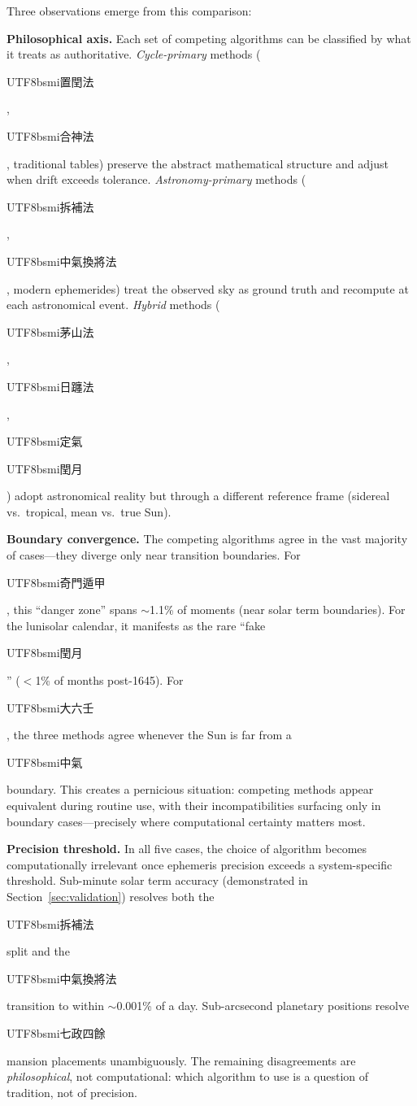 \documentclass[10pt,a4paper]{article}
\newcommand{\zh}[1]{\begin{CJK}{UTF8}{bsmi}#1\end{CJK}}
\begin{document}
Three observations emerge from this comparison:

\textbf{Philosophical axis.} Each set of competing algorithms can be
classified by what it treats as authoritative. \emph{Cycle-primary}
methods (\zh{置閏法}, \zh{合神法}, traditional tables) preserve the
abstract mathematical structure and adjust when drift exceeds tolerance.
\emph{Astronomy-primary} methods (\zh{拆補法}, \zh{中氣換將法}, modern
ephemerides) treat the observed sky as ground truth and recompute at each
astronomical event. \emph{Hybrid} methods (\zh{茅山法}, \zh{日躔法},
\zh{定氣} \zh{閏月}) adopt astronomical reality but through a different
reference frame (sidereal vs.\ tropical, mean vs.\ true Sun).

\textbf{Boundary convergence.} The competing algorithms agree in the vast
majority of cases---they diverge only near transition boundaries. For
\zh{奇門遁甲}, this ``danger zone'' spans $\sim$1.1\% of moments (near
solar term boundaries). For the lunisolar calendar, it manifests as the rare
``fake \zh{閏月}'' ($<$1\% of months post-1645). For \zh{大六壬}, the
three methods agree whenever the Sun is far from a \zh{中氣} boundary.
This creates a pernicious situation: competing methods appear equivalent
during routine use, with their incompatibilities surfacing only in
boundary cases---precisely where computational certainty matters most.

\textbf{Precision threshold.} In all five cases, the choice of algorithm
becomes computationally irrelevant once ephemeris precision exceeds a
system-specific threshold. Sub-minute solar term accuracy (demonstrated
in Section~\ref{sec:validation}) resolves both the \zh{拆補法} split and
the \zh{中氣換將法} transition to within $\sim$0.001\% of a day.
Sub-arcsecond planetary positions resolve \zh{七政四餘} mansion placements
unambiguously. The remaining disagreements are \emph{philosophical}, not
computational: which algorithm to use is a question of tradition, not of
precision.
\end{document}
